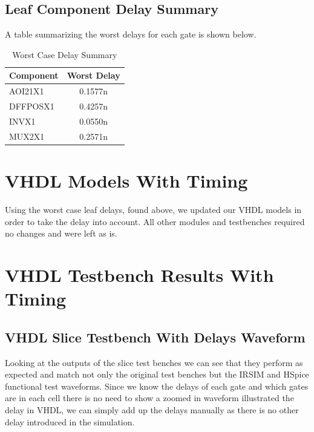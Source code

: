     \vspace{2\baselineskip}
    \subsection{Leaf Component Delay Summary}

        A table summarizing the worst delays for each gate is shown below.

        \begin{table}[H]
            \centering
            \begin{tabular}{lc}
                \toprule
                \textbf{Component} & \textbf{Worst Delay} \\
                \midrule
                AOI21X1  & 0.1577n \\
                DFFPOSX1 & 0.4257n \\
                INVX1    & 0.0550n \\
                MUX2X1   & 0.2571n \\
                \bottomrule
            \end{tabular}
            \caption{Worst Case Delay Summary}
        \end{table}

\newpage
\section{VHDL Models With Timing}
    Using the worst case leaf delays, found above, we updated our VHDL models
    in order to take the delay into account.  All other modules and testbenches
    required no changes and were left as is.
    
    
    
    
\section{VHDL Testbench Results With Timing}

    \subsection{VHDL Slice Testbench With Delays Waveform}

        Looking at the outputs of the slice test benches we can see that they
        perform as expected and match not only the original test benches but
        the IRSIM and HSpice functional test waveforms.  Since we know the
        delays of each gate and which gates are in each cell there is no need
        to show a zoomed in waveform illustrated the delay in VHDL, we can
        simply add up the delays manually as there is no other delay introduced
        in the simulation.

